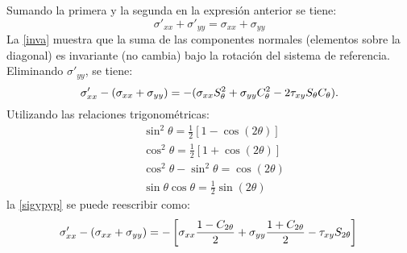 \documentclass[../notas medios.tex]{subfiles}
\begin{document}
Sumando la primera y la  segunda en la expresión anterior se tiene:
\begin{equation}
\sigma'_{xx} + \sigma'_{yy} = \sigma_{xx} + \sigma_{yy}
\label{inva}
\end{equation}
%
La  \cref{inva} muestra que la suma de las componentes normales (elementos 
sobre la diagonal) es invariante (no cambia) bajo la rotación del sistema de 
referencia. Eliminando $\sigma'_{yy}$, se tiene:\\
%
\begin{equation}
\sigma'_{xx} - (\sigma_{xx} + \sigma_{yy}) = -(\sigma_{xx} S^2_\theta + 
\sigma_{yy} C^2_\theta - 2 \tau_{xy} S_\theta C_\theta). \\
\label{sigypyp}
\end{equation}
%
Utilizando las relaciones trigonométricas:\\
\begin{align*}
&\sin^2\theta = \frac{1}{2}[1 - \cos(2\theta)]\\
&\cos^2\theta = \frac{1}{2}[1 + \cos(2\theta)]\\
&\cos^2\theta -\sin^2 \theta =  \cos( 2 \theta)\\
&\sin\theta \cos\theta = \frac{1}{2}\sin(2\theta)
\end{align*}
la \cref{sigypyp} se puede reescribir como: \\

\begin{equation*}
	\sigma ' _{xx} -(\sigma _{xx} + \sigma _{yy}) = -\left[ \sigma _{xx} \frac{1-C_{2\theta}}{2} + \sigma _{yy} \frac{1+ C _{2\theta}}{2} - \tau _{xy} S_{2\theta} \right] \\
\end{equation*} \\\\
\end{document}
